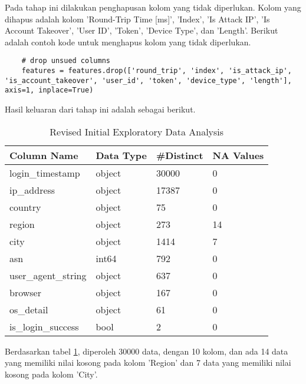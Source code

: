 Pada tahap ini dilakukan penghapusan kolom yang tidak diperlukan. Kolom yang dihapus adalah kolom 'Round-Trip Time [ms]', 'Index', 'Is Attack IP', 'Is Account Takeover', 'User ID', 'Token', 'Device Type', dan 'Length'. Berikut adalah contoh kode untuk menghapus kolom yang tidak diperlukan.

\begin{lstlisting}
    # drop unsued columns
    features = features.drop(['round_trip', 'index', 'is_attack_ip', 'is_account_takeover', 'user_id', 'token', 'device_type', 'length'], axis=1, inplace=True)
    \end{lstlisting}

Hasil keluaran dari tahap ini adalah sebagai berikut. 

\begin{table}[H]
    \centering
    \begin{tabular}{|l|l|l|l|}
    \hline
    \textbf{Column Name} & \textbf{Data Type} & \textbf{\#Distinct} & \textbf{NA Values} \\ \hline
    login\_timestamp & object & 30000 & 0 \\ 
    ip\_address & object & 17387 & 0 \\ 
    country & object & 75 & 0 \\ 
    region & object & 273 & 14 \\ 
    city & object & 1414 & 7 \\ 
    asn & int64 & 792 & 0 \\ 
    user\_agent\_string & object & 637 & 0 \\ 
    browser & object & 167 & 0 \\ 
    os\_detail & object & 61 & 0 \\ 
    is\_login\_success & bool & 2 & 0 \\ \hline
    \end{tabular}
    \caption{Revised Initial Exploratory Data Analysis}
    \label{tab:revised_initial_eda}
    \end{table}

    Berdasarkan tabel \ref{tab:revised_initial_eda}, diperoleh 30000 data, dengan 10 kolom, dan ada 14 data yang memiliki nilai kosong pada kolom 'Region' dan 7 data yang memiliki nilai kosong pada kolom 'City'.
